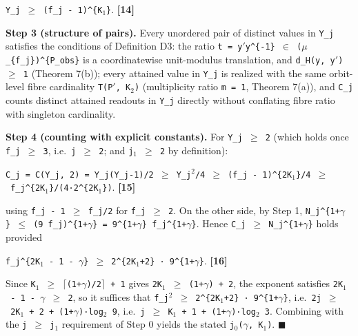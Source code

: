 \documentclass[
  american,
  11pt,
  letterpaper,
]{article}
\begin{document}
\texttt{\textbar{}Y\_j\textbar{}\ \ensuremath{\geq}\ (f\_j\ -\ 1)\^{}\{K\ensuremath{{}_{1}}\}}. \textbf{{[}14{]}}

\textbf{Step 3 (structure of pairs).} Every unordered pair of distinct values in \texttt{Y\_j} satisfies the conditions of Definition D3: the ratio \texttt{t\ =\ y\ensuremath{'}y\^{}\{-1\}\ \ensuremath{\in}\ (\ensuremath{\mu}\_\{f\_j\})\^{}\{P\_obs\}} is a coordinatewise unit-modulus translation, and \texttt{d\_H(y,\ y\ensuremath{'})\ \ensuremath{\geq}\ 1} (Theorem 7(b)); every attained value in \texttt{Y\_j} is realized with the same orbit-level fibre cardinality \texttt{\textbar{}T(P\ensuremath{'},\ K\ensuremath{{}_{2}})\textbar{}} (multiplicity ratio \texttt{m\ =\ 1}, Theorem 7(a)), and \texttt{C\_j} counts distinct attained readouts in \texttt{Y\_j} directly without conflating fibre ratio with singleton cardinality.

\textbf{Step 4 (counting with explicit constants).} For \texttt{\textbar{}Y\_j\textbar{}\ \ensuremath{\geq}\ 2} (which holds once \texttt{f\_j\ \ensuremath{\geq}\ 3}, i.e.~\texttt{j\ \ensuremath{\geq}\ 2}; and \texttt{j\ensuremath{{}_{1}}\ \ensuremath{\geq}\ 2} by definition):

\texttt{C\_j\ =\ C(\textbar{}Y\_j\textbar{},\ 2)\ =\ \textbar{}Y\_j\textbar{}(\textbar{}Y\_j\textbar{}-1)/2\ \ensuremath{\geq}\ \textbar{}Y\_j\textbar{}\ensuremath{{}^{2}}/4\ \ensuremath{\geq}\ (f\_j\ -\ 1)\^{}\{2K\ensuremath{{}_{1}}\}/4\ \ensuremath{\geq}\ f\_j\^{}\{2K\ensuremath{{}_{1}}\}/(4·2\^{}\{2K\ensuremath{{}_{1}}\})}. \textbf{{[}15{]}}

using \texttt{f\_j\ -\ 1\ \ensuremath{\geq}\ f\_j/2} for \texttt{f\_j\ \ensuremath{\geq}\ 2}. On the other side, by Step 1, \texttt{N\_j\^{}\{1+\ensuremath{\gamma}\}\ \ensuremath{\leq}\ (9\ f\_j)\^{}\{1+\ensuremath{\gamma}\}\ =\ 9\^{}\{1+\ensuremath{\gamma}\}\ f\_j\^{}\{1+\ensuremath{\gamma}\}}. Hence \texttt{C\_j\ \ensuremath{\geq}\ N\_j\^{}\{1+\ensuremath{\gamma}\}} holds provided

\texttt{f\_j\^{}\{2K\ensuremath{{}_{1}}\ -\ 1\ -\ \ensuremath{\gamma}\}\ \ensuremath{\geq}\ 2\^{}\{2K\ensuremath{{}_{1}}+2\}\ ·\ 9\^{}\{1+\ensuremath{\gamma}\}}. \textbf{{[}16{]}}

Since \texttt{K\ensuremath{{}_{1}}\ \ensuremath{\geq}\ \ensuremath{\lceil}(1+\ensuremath{\gamma})/2\ensuremath{\rceil}\ +\ 1} gives \texttt{2K\ensuremath{{}_{1}}\ \ensuremath{\geq}\ (1+\ensuremath{\gamma})\ +\ 2}, the exponent satisfies \texttt{2K\ensuremath{{}_{1}}\ -\ 1\ -\ \ensuremath{\gamma}\ \ensuremath{\geq}\ 2}, so it suffices that \texttt{f\_j\ensuremath{{}^{2}}\ \ensuremath{\geq}\ 2\^{}\{2K\ensuremath{{}_{1}}+2\}\ ·\ 9\^{}\{1+\ensuremath{\gamma}\}}, i.e.~\texttt{2j\ \ensuremath{\geq}\ 2K\ensuremath{{}_{1}}\ +\ 2\ +\ (1+\ensuremath{\gamma})·log\ensuremath{{}_{2}}\ 9}, i.e.~\texttt{j\ \ensuremath{\geq}\ K\ensuremath{{}_{1}}\ +\ 1\ +\ (1+\ensuremath{\gamma})·log\ensuremath{{}_{2}}\ 3}. Combining with the \texttt{j\ \ensuremath{\geq}\ j\ensuremath{{}_{1}}} requirement of Step 0 yields the stated \texttt{j\ensuremath{{}_{0}}(\ensuremath{\gamma},\ K\ensuremath{{}_{1}})}. \ensuremath{\blacksquare}
\end{document}
